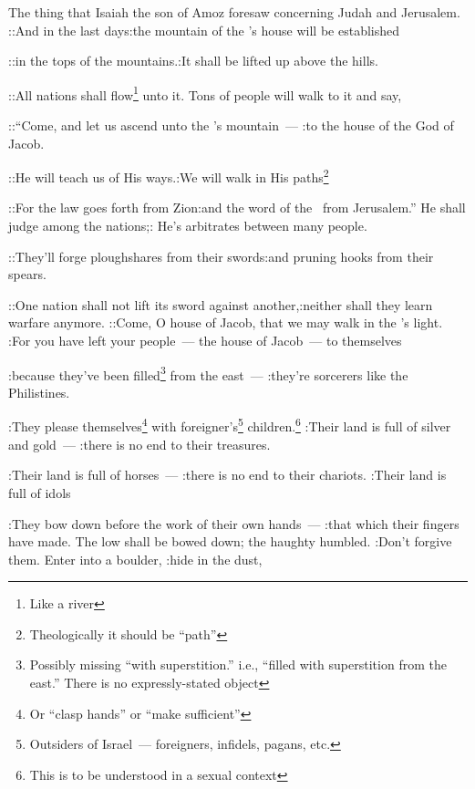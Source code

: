 
\begin{inparaenum}
   The thing that Isaiah the son of Amoz foresaw concerning Judah and Jerusalem.%
   ::And in the last days:the mountain of the \lord's house will be established%

  ::in the tops of the mountains.:It shall be lifted up above the hills.%

  ::All nations shall flow\footnote{Like a river} unto it. Tons of people will walk to it and say,%

  ::``Come, and let us ascend unto the \lord's mountain~--- :to the house of the God of Jacob.%

  ::He will teach us of His ways.:We will walk in His paths\footnote{Theologically it should be ``path''}%

  ::For the law goes forth from Zion:and the word of the \lord\ from Jerusalem.''%
   He shall judge among the nations;: He's arbitrates between many people.%

  ::They'll forge ploughshares from their swords:and pruning hooks from their spears.%

  ::One nation shall not lift its sword against another,:neither shall they learn warfare anymore.%
   ::Come, O house of Jacob, that we may walk in the \lord's light.%
   :For you have left your people~--- the house of Jacob~--- to themselves%

  :because they've been filled\footnote{Possibly missing ``with superstition.'' i.e., ``filled with superstition from the east.'' There is no expressly-stated object} from the east~--- :they're sorcerers like the Philistines.%

  :They please themselves\footnote{Or ``clasp hands'' or ``make sufficient''} with foreigner's\footnote{Outsiders of Israel~--- foreigners, infidels, pagans, etc.} children.\footnote{This is to be understood in a sexual context}%
   :Their land is full of silver and gold~--- :there is no end to their treasures.%

  :Their land is full of horses~--- :there is no end to their chariots.%
   :Their land is full of idols%

  :They bow down before the work of their own hands~--- :that which their fingers have made.%
   The low shall be bowed down; the haughty humbled. :Don't forgive them.%
   Enter into a boulder, :hide in the dust,%


\end{inparaenum}
